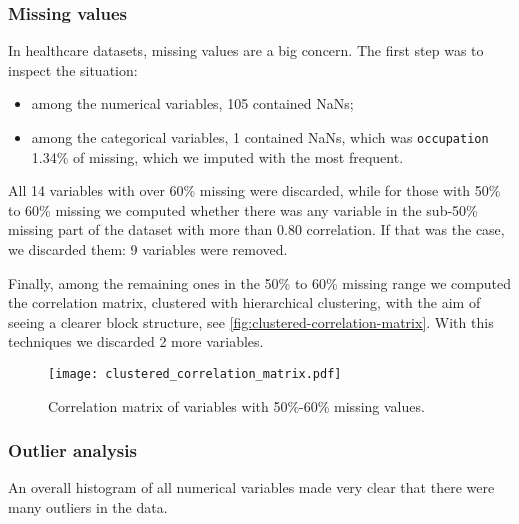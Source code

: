 \subsubsection{Missing values}

In healthcare datasets, missing values are a big concern. The first step was to inspect the situation:
\begin{itemize}
    \item among the numerical variables, 105 contained NaNs;
    \item among the categorical variables, 1 contained NaNs, which was \texttt{occupation} 1.34\% of missing, which we imputed with the most frequent.
\end{itemize}



All 14 variables with over 60\% missing were discarded, while for those with 50\% to 60\% missing we computed whether there was any variable in the sub-50\% missing part of the dataset with more than 0.80 correlation. If that was the case, we discarded them: 9 variables were removed.

Finally, among the remaining ones in the 50\% to 60\% missing range we computed the correlation matrix, clustered with hierarchical clustering, with the aim of seeing a clearer block structure, see \autoref{fig:clustered-correlation-matrix}. With this techniques we discarded 2 more variables.

\begin{figure}[htpb]
    \centering
    \texttt{[image: clustered\_correlation\_matrix.pdf]}
    \caption{Correlation matrix of variables with 50\%-60\% missing values.}
    \label{fig:clustered-correlation-matrix}
\end{figure}

\subsubsection{Outlier analysis}\label{sec:outlier-analysis}

An overall histogram of all numerical variables made very clear that there were many outliers in the data.

